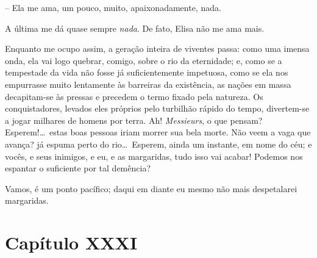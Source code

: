 -- Ela me ama, um pouco, muito, apaixonadamente, nada. 

A última me dá quase sempre \textit{nada}. De fato, Elisa não me ama
mais.

Enquanto me ocupo assim, a geração inteira de viventes passa: como uma
imensa onda, ela vai logo quebrar, comigo, sobre o rio da eternidade;
e, como se a tempestade da vida não fosse já suficientemente impetuosa,
como se ela nos empurrasse muito lentamente às barreiras da existência,
as nações em massa decapitam-se às pressas e precedem o termo fixado
pela natureza. Os conquistadores, levados eles próprios pelo turbilhão
rápido do tempo, divertem-se a jogar milhares de homens por terra. Ah!
\textit{Messieurs}, o que pensam? Esperem!\ldots\ estas boas pessoas iriam
morrer sua bela morte. Não veem a vaga que avança? já espuma perto do
rio\ldots\ Esperem, ainda um instante, em nome do céu; e vocês, e seus
inimigos, e eu, e as margaridas, tudo isso vai acabar! Podemos nos
espantar o suficiente por tal demência?

Vamos, é um ponto pacífico; daqui em diante eu mesmo não mais
despetalarei margaridas.

\section*{Capítulo XXXI}


